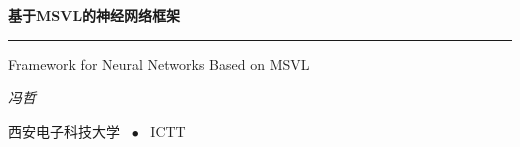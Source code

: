 \documentclass[UTF-8]{progbookcn}
\begin{document}
\begin{titlepage}
  \vspace*{25ex}

  \hspace{0.05\textwidth}\begin{minipage}{.9\textwidth}
    \flushright

    {\textbf{基于MSVL的神经网络框架}}

    \rule{\linewidth}{.5pt}

    \vspace{2ex}

    {\textsf{Framework for Neural Networks Based on MSVL}} \\

    \vspace{20ex}

    {\textit{冯哲}}~~~~~~~~~~~~~~~~~~~

    \vspace{20ex}

  \end{minipage}

  \vfill

  \centering
  { \textsf{西安电子科技大学} ~$\bullet$~ \textsf{ICTT}}
\end{titlepage}
\thispagestyle{empty}


\frontmatter
\end{document}
